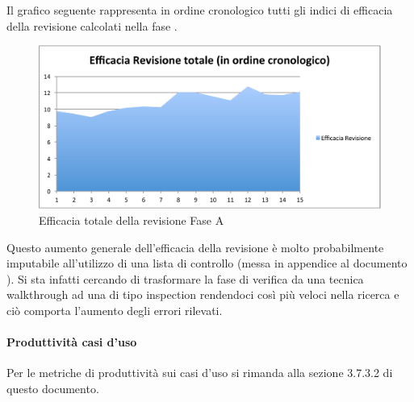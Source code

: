 						Il grafico seguente rappresenta in ordine cronologico tutti gli indici di efficacia della revisione calcolati nella fase .
						\begin{figure}[H]\centering
							\includegraphics[width=12cm]{PianoDiQualifica/Pics/EfficaciaTotaleFaseA.pdf}
							\caption{Efficacia totale della revisione Fase A}
						\end{figure}
						Questo aumento generale dell'efficacia della revisione è molto probabilmente imputabile all'utilizzo di una lista di controllo (messa in appendice al documento ). Si sta infatti cercando di trasformare la fase di verifica da una tecnica walkthrough ad una di tipo inspection rendendoci così più veloci nella ricerca e ciò comporta l'aumento degli errori rilevati.
						
					\paragraph{Produttività casi d'uso}
						Per le metriche di produttività sui casi d'uso si rimanda alla sezione 3.7.3.2 di questo documento.\\
						
						
						 